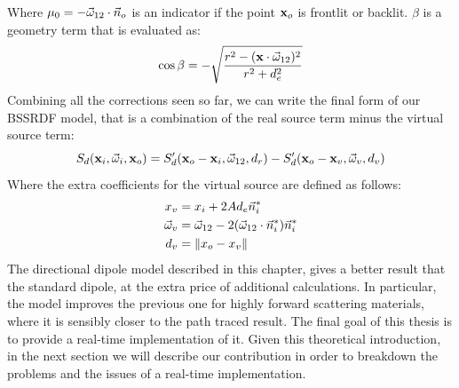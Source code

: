 Where $\mu_0 = - \vec{\omega}_{12} \cdot \vec{n}_o$ is an indicator if the point $\mathbf{x}_o$ is frontlit or backlit. $\beta$ is a geometry term that is evaluated as:
$$
\cos \beta = - \sqrt{\frac{r^2 - (\mathbf{x} \cdot \vec{\omega}_{12})^2}{r^2 + d_e^2}}
$$
Combining all the corrections seen so far, we can write the final form of our BSSRDF model, that is a combination of the real source term minus the virtual source term:
$$
S_d(\mathbf{x}_i, \vec{\omega}_i, \mathbf{x}_o) = S'_d(\mathbf{x}_o - \mathbf{x}_i, \vec{\omega}_{12}, d_r) - S'_d(\mathbf{x}_o - \mathbf{x}_v, \vec{\omega}_{v}, d_v)
$$
Where the extra coefficients for the virtual source are defined as follows:
\begin{equation*}
\begin{split}
x_v &= x_i + 2 A d_e \vec{n}_i^* \\
\vec{\omega}_v &= \vec{\omega}_{12} - 2 (\vec{\omega}_{12} \cdot \vec{n}_i^*) \vec{n}_i^* \\
d_v &= \|x_o - x_v\|
\end{split}
\end{equation*}
The directional dipole model described in this chapter, gives a better result that the standard dipole, at the extra price of additional calculations. In particular, the model improves the previous one for highly forward scattering materials, where it is sensibly closer to the path traced result. The final goal of this thesis is to provide a real-time implementation of it. Given this theoretical introduction, in the next section we will describe our contribution in order to breakdown the problems and the issues of a real-time implementation.

